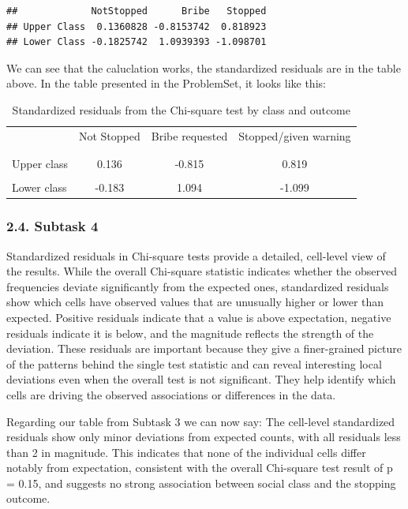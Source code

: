 \documentclass[
]{article}
\begin{document}
\begin{verbatim}
##             NotStopped      Bribe   Stopped
## Upper Class  0.1360828 -0.8153742  0.818923
## Lower Class -0.1825742  1.0939393 -1.098701
\end{verbatim}
We can see that the caluclation works, the standardized residuals are in the table above. 
In the table presented in the ProblemSet, it looks like this: 
\begin{table}[h]
	\centering
	\begin{tabular}{l | c c c }
		& Not Stopped & Bribe requested & Stopped/given warning \\
		\\[-1.8ex] 
		\hline \\[-1.8ex]
		Upper class  & 0.136 & -0.815 & 0.819 \\
		\\[-1.8ex]
		Lower class & -0.183 & 1.094 & -1.099 \\
	\end{tabular}
	\caption{Standardized residuals from the Chi-square test by class and outcome}
	\label{tab:chi2-residuals}
\end{table}

\subsubsection{2.4. Subtask 4}\label{subtask-4-question-1}
Standardized residuals in Chi-square tests provide a detailed, cell-level view of the results. While the overall Chi-square statistic indicates whether the observed frequencies deviate significantly from the expected ones, standardized residuals show which cells have observed values that are unusually higher or lower than expected. Positive residuals indicate that a value is above expectation, negative residuals indicate it is below, and the magnitude reflects the strength of the deviation. These residuals are important because they give a finer-grained picture of the patterns behind the single test statistic and can reveal interesting local deviations even when the overall test is not significant. They help identify which cells are driving the observed associations or differences in the data. 

Regarding our table from Subtask 3 we can now say: 
The cell-level standardized residuals show only minor deviations from expected counts, with all residuals less than 2 in magnitude. This indicates that none of the individual cells differ notably from expectation, consistent with the overall Chi-square test result of p = 0.15, and suggests no strong association between social class and the stopping outcome.\newline
\end{document}
